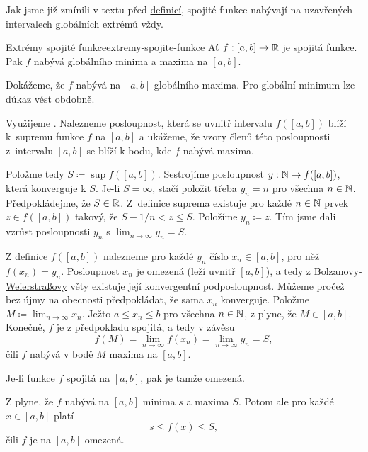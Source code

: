 Jak jsme již zmínili v textu před
\hyperref[def:lokalni-a-globalni-extrem]{definicí}, spojité funkce nabývají na
uzavřených intervalech globálních extrémů vždy.

\begin{theorem}{Extrémy spojité funkce}{extremy-spojite-funkce}
 Ať $f:[a,b] \to \mathbb{R}$ je spojitá funkce. Pak $f$ nabývá globálního minima a
 maxima na $[a,b]$.
\end{theorem}
\begin{thmproof}
 Dokážeme, že $f$ nabývá na $[a,b]$ globálního maxima. Pro globální minimum lze
 důkaz vést obdobně.

 Využijeme . Nalezneme
 posloupnost, která se uvnitř intervalu $f([a,b])$ blíží k~supremu funkce $f$ na
 $[a,b]$ a ukážeme, že vzory členů této posloupnosti z~intervalu $[a,b]$ se
 blíží k bodu, kde $f$ nabývá maxima.

 Položme tedy $S \coloneqq \sup f([a,b])$. Sestrojíme posloupnost $y: \mathbb{N} \to
 f([a,b])$, která konverguje k $S$. Je-li $S=\infty$, stačí položit třeba $y_n =
 n$ pro všechna $n \in \mathbb{N}$. Předpokládejme, že $S \in \mathbb{R}$. Z~definice suprema
 existuje pro každé $n \in \mathbb{N}$ prvek $z \in f([a,b])$ takový, že $S-1 / n < z
 \leq S$. Položíme $y_n \coloneqq z$. Tím jsme dali vzrůst posloupnosti $y_n$ s
 $\lim_{n \to \infty} y_n = S$.

 Z definice $f([a,b])$ nalezneme pro každé $y_n$ číslo $x_n \in [a,b]$, pro něž
 $f(x_n) = y_n$. Posloupnost $x_n$ je omezená (leží uvnitř $[a,b]$), a tedy z
 \hyperref[thm:bolzano-weierstrass]{Bolzanovy-Weierstraßovy} věty existuje její
 konvergentní podposloupnost. Můžeme pročež bez újmy na obecnosti předpokládat,
 že sama $x_n$ konverguje. Položme $M \coloneqq \lim_{n \to \infty} x_n$. Ježto
 $a \leq x_n \leq b$ pro všechna $n \in \mathbb{N}$, z
  plyne, že $M \in [a,b]$. Konečně, $f$
 je z předpokladu spojitá, a tedy v závěsu
 \[
  f(M) = \lim_{n \to \infty} f(x_n) = \lim_{n \to \infty} y_n = S,
 \]
 čili $f$ nabývá v bodě $M$ maxima na $[a,b]$.
\end{thmproof}

\begin{corollary}{}{}
 Je-li funkce $f$ spojitá na $[a,b]$, pak je tamže omezená.
\end{corollary}
\begin{corproof}
 Z  plyne, že $f$ nabývá na $[a,b]$
 minima $s$ a maxima $S$. Potom ale pro každé $x \in [a,b]$ platí
 \[
  s \leq f(x) \leq S,
 \]
 čili $f$ je na $[a,b]$ omezená.
\end{corproof}
